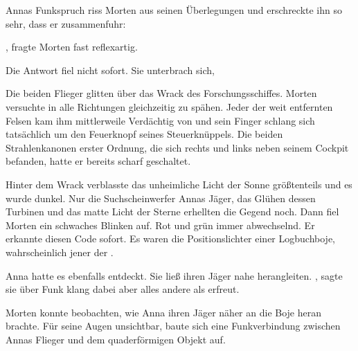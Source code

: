 \par

Annas Funkspruch riss Morten aus seinen Überlegungen und erschreckte ihn so sehr, dass er zusammenfuhr: 

\par

, fragte Morten fast reflexartig.

\par

Die Antwort fiel nicht sofort.  Sie unterbrach sich, 

\par

Die beiden Flieger glitten über das Wrack des Forschungsschiffes. Morten versuchte in alle Richtungen gleichzeitig zu spähen. Jeder der weit entfernten Felsen kam ihm mittlerweile Verdächtig von und sein Finger schlang sich tatsächlich um den Feuerknopf seines Steuerknüppels. Die beiden Strahlenkanonen erster Ordnung, die sich rechts und links neben seinem Cockpit befanden, hatte er bereits scharf geschaltet.

\par

Hinter dem Wrack verblasste das unheimliche Licht der Sonne größtenteils und es wurde dunkel. Nur die Suchscheinwerfer Annas Jäger, das Glühen dessen Turbinen und das matte Licht der Sterne erhellten die Gegend noch. Dann fiel Morten ein schwaches Blinken auf. Rot und grün immer abwechselnd. Er erkannte diesen Code sofort. Es waren die Positionslichter einer Logbuchboje, wahrscheinlich jener der .

\par

Anna hatte es ebenfalls entdeckt. Sie ließ ihren Jäger nahe herangleiten. , sagte sie über Funk klang dabei aber alles andere als erfreut. 

\par

Morten konnte beobachten, wie Anna ihren Jäger näher an die Boje heran brachte. Für seine Augen unsichtbar, baute sich eine Funkverbindung zwischen Annas Flieger und dem quaderförmigen Objekt auf.

